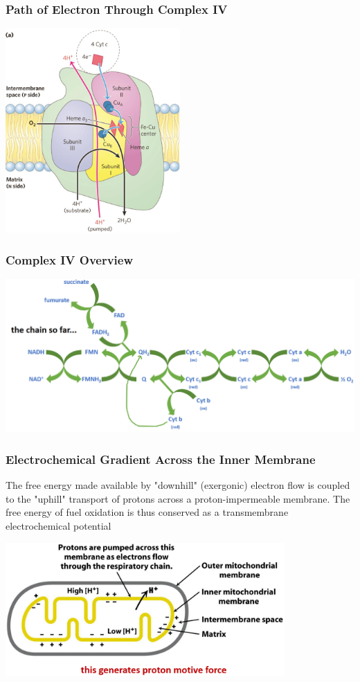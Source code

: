 \documentclass[10pt]{article}
\begin{document}
\subsubsection*{Path of Electron Through Complex IV}
\begin{center} 
    \includegraphics*[width=0.5\textwidth]{L2_19.png} 
\end{center}

\subsubsection*{Complex IV Overview}
\begin{center} 
	\includegraphics*[width=\textwidth]{L2_20.png} 
\end{center}

\subsubsection*{Electrochemical Gradient Across the Inner Membrane}
The free energy made available by "downhill" (exergonic) electron flow is coupled to the "uphill" transport of protons across a proton-impermeable membrane.  The free energy of fuel oxidation is thus conserved as a transmembrane electrochemical potential
\begin{center} 
	\includegraphics*[width=0.8\textwidth]{L2_21.png} 
\end{center}
\end{document}
